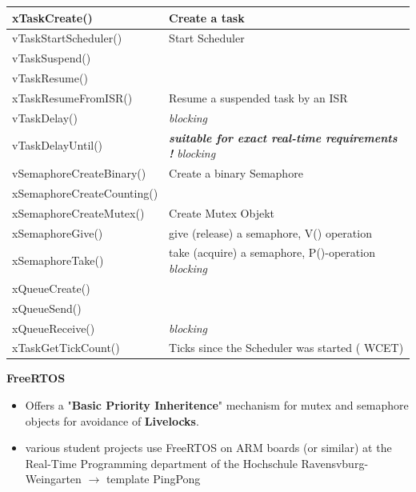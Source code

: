 \begin{table}[h!]
\setlength{\tabcolsep}{10pt} %
\renewcommand{\arraystretch}{1.5} %
\centering
\begin{tabular}{|l|l|} \hline 
xTaskCreate() & Create a task \\ \hline 
vTaskStartScheduler() & Start Scheduler \\ \hline 
vTaskSuspend() &  \\ \hline 
vTaskResume() &  \\ \hline 
xTaskResumeFromISR() & Resume a suspended task by an ISR \\ \hline 
vTaskDelay() &                    \textit{blocking} \\ \hline 
vTaskDelayUntil() & \textbf{\textit{ suitable for exact real-time requirements !  }}\textit{blocking}\textbf{\textit{}} \\ \hline 
\textbf{\textit{}}vSemaphoreCreateBinary() & Create a binary Semaphore \\ \hline 
xSemaphoreCreateCounting() &  \\ \hline 
xSemaphoreCreateMutex()  & Create Mutex Objekt \\ \hline 
xSemaphoreGive() & give (release) a semaphore, V() operation \\ \hline 
xSemaphoreTake() & take (acquire) a semaphore, P()-operation    \textit{blocking} \\ \hline 
xQueueCreate() &  \\ \hline 
xQueueSend() &  \\ \hline 
xQueueReceive() &                    \textit{blocking} \\ \hline 
xTaskGetTickCount() & Ticks since the Scheduler was started ( WCET) \\ \hline 
\end{tabular}
\end{table}

{\rot\bf FreeRTOS }\\
\begin{itemize}
\item Offers a "\textbf{Basic Priority Inheritence}" mechanism for mutex and semaphore objects for avoidance of \textbf{Livelocks}.
\item various student projects use FreeRTOS on ARM boards (or similar) at the Real-Time Programming department of the Hochschule Ravensvburg-Weingarten $\rightarrow$ template PingPong
\end{itemize}

